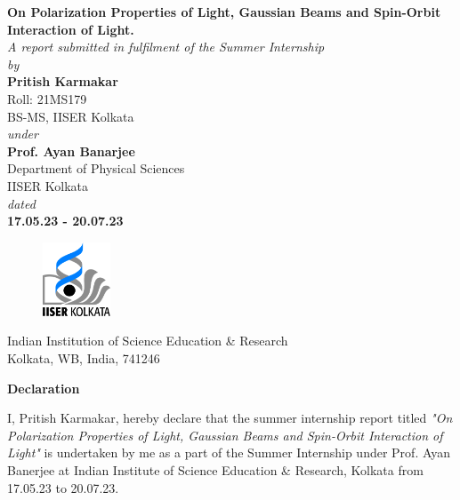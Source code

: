 \documentclass[11pt,a4paper]{article}
\author{Pritish Karmakar}
\numberwithin{equation}{section}
\begin{document}
	\begin{titlepage}
		
		\begin{center}
			\vspace*{0.2cm}
			\LARGE
			\textbf{\Huge On Polarization Properties of Light, Gaussian Beams and Spin-Orbit Interaction of Light.}
			\vspace{1cm}
			\\ \textit{A report submitted in fulfilment of
			the Summer Internship}\\\textit{by}\\\vspace{0.2cm}
			\textbf{Pritish Karmakar}\\{\Large Roll: 21MS179}\\{\Large BS-MS, IISER Kolkata}\\\vspace{1cm}
			\textit{under}\\\vspace{0.2cm}
			\textbf{ Prof. Ayan Banarjee}\\
			{\Large Department of Physical Sciences}\\
			{\Large IISER Kolkata}\\\vspace{1cm}
			\textit{dated}\\\vspace{0.2cm}
			\textbf{17.05.23 - 20.07.23}\\
			\vfill
			\begin{figure}[H]
				\centering
				\includegraphics[width=2cm]{iiserk}
			\end{figure} 
			\vspace{0.7cm}
			Indian Institution of Science Education \& Research\\
			Kolkata, WB, India, 741246
			\vspace{0.2cm}
			
		\end{center}
		
		\clearpage
		
		{\Huge\bfseries Declaration }\\
		\vspace{9mm}
		
		\Large
		I, Pritish Karmakar, hereby declare that the summer internship report titled \textit{"On Polarization Properties of Light, Gaussian Beams and Spin-Orbit Interaction of Light"} is undertaken by me as a part of the Summer Internship under Prof. Ayan Banerjee at Indian Institute of Science Education \& Research, Kolkata from 17.05.23 to 20.07.23.\\ 
		

\end{titlepage}
\end{document}
